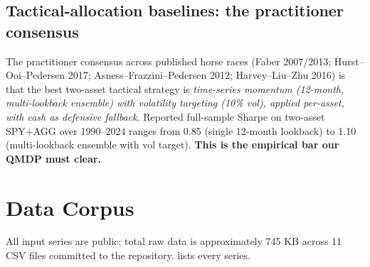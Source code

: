 \documentclass[11pt]{article}
\theoremstyle{plain1}
\theoremstyle{definition1}
\newcommand{\1}{\mathbf{1}}
\begin{document}
\subsection{Tactical-allocation baselines: the practitioner consensus}

The practitioner consensus across published horse races (Faber 2007/2013; Hurst--Ooi--Pedersen 2017; Asness--Frazzini--Pedersen 2012; Harvey--Liu--Zhu 2016) is that the best two-asset tactical strategy is \emph{time-series momentum (12-month, multi-lookback ensemble) with volatility targeting (10\% vol), applied per-asset, with cash as defensive fallback}. Reported full-sample Sharpe on two-asset SPY+AGG over 1990--2024 ranges from 0.85 (single 12-month lookback) to 1.10 (multi-lookback ensemble with vol target). \textbf{This is the empirical bar our QMDP must clear.}

\section{Data Corpus}\label{sec:data}

All input series are public; total raw data is approximately 745 KB across 11 CSV files committed to the repository.  lists every series.
\end{document}
